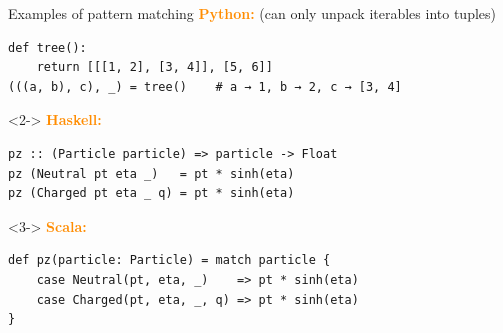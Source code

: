 \documentclass[aspectratio=169]{beamer}
\begin{document}
\begin{frame}[fragile]{Examples of pattern matching}
\Large
\vspace{0.25 cm}
\textcolor{darkorange}{\bf Python:} (can only unpack iterables into tuples)

\begin{center}
\begin{minipage}{0.85\linewidth}
\normalsize
\begin{verbatim}
def tree():
    return [[[1, 2], [3, 4]], [5, 6]]
(((a, b), c), _) = tree()    # a → 1, b → 2, c → [3, 4]
\end{verbatim}
\end{minipage}
\end{center}

\vspace{0.35 cm}
\begin{uncoverenv}<2->
\textcolor{darkorange}{\bf Haskell:}

\begin{center}
\begin{minipage}{0.85\linewidth}
\normalsize
\begin{verbatim}
pz :: (Particle particle) => particle -> Float
pz (Neutral pt eta _)   = pt * sinh(eta)
pz (Charged pt eta _ q) = pt * sinh(eta)
\end{verbatim}
\end{minipage}
\end{center}
\end{uncoverenv}

\vspace{0.35 cm}
\begin{uncoverenv}<3->
\textcolor{darkorange}{\bf Scala:}

\begin{center}
\begin{minipage}{0.85\linewidth}
\normalsize
\begin{verbatim}
def pz(particle: Particle) = match particle {
    case Neutral(pt, eta, _)    => pt * sinh(eta)
    case Charged(pt, eta, _, q) => pt * sinh(eta)
}
\end{verbatim}
\end{minipage}
\end{center}
\end{uncoverenv}
\end{frame}
\end{document}
